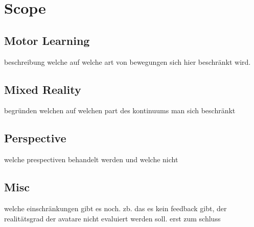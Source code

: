 \chapter{Scope}
\section{Motor Learning}
beschreibung welche auf welche art von bewegungen sich hier beschränkt wird.

\section{Mixed Reality}
begründen welchen auf welchen part des kontinuums man sich beschränkt

\section{Perspective}
welche prespectiven behandelt werden und welche nicht


\section{Misc}
welche einschränkungen gibt es noch. zb. das es kein feedback gibt, der realitätsgrad der avatare nicht evaluiert werden soll. erst zum schluss


